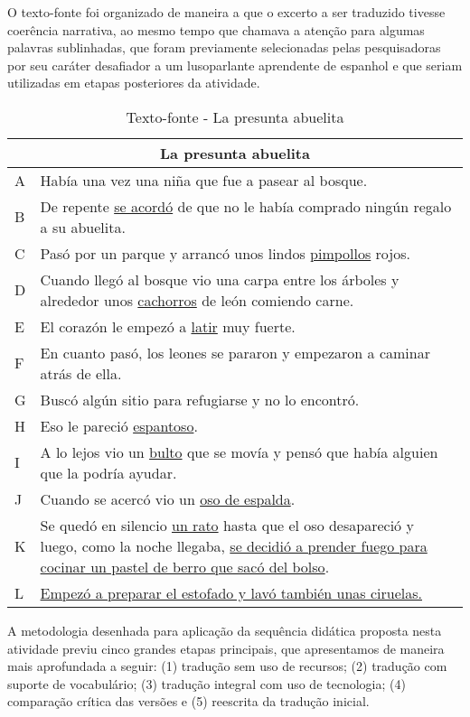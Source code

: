 \documentclass[portuguese]{textolivre}
\begin{document}
O texto-fonte foi organizado de maneira a que o excerto a ser traduzido tivesse coerência narrativa, ao mesmo tempo que chamava a atenção para algumas palavras sublinhadas, que foram previamente selecionadas pelas pesquisadoras por seu caráter desafiador a um lusoparlante aprendente de espanhol e que seriam utilizadas em etapas posteriores da atividade.

\begin{table}[h!]
\centering
\caption{Texto-fonte - La presunta abuelita}
\label{quadro1}
\begin{tabular}{l p{13.6cm}}
\toprule 
\multicolumn{2}{c}{La presunta abuelita} \\
\midrule
A & Había una vez una niña que fue a pasear al bosque.\\ 
B & De repente \underline{se acordó} de que no le había comprado ningún regalo a su abuelita. \\  
C & Pasó por un parque y arrancó unos lindos \underline{pimpollos} rojos. \\
D & Cuando llegó al bosque vio una carpa entre los árboles y alrededor unos \underline{cachorros} de león comiendo carne. \\
E & El corazón le empezó a \underline{latir} muy fuerte.\\
F & En cuanto pasó, los leones se pararon y empezaron a caminar atrás de ella.\\
G & Buscó algún sitio para refugiarse y no lo encontró. \\
H & Eso le pareció \underline{espantoso}. \\
I & A lo lejos vio un \underline{bulto} que se movía y pensó que había alguien que la podría ayudar. \\
J & Cuando se acercó vio un \underline{oso de espalda}. \\
K & Se quedó en silencio \underline{un rato} hasta que el oso desapareció y luego, como la noche llegaba, \underline{se decidió a prender fuego para cocinar un pastel de berro que sacó del bolso}. \\
L & \underline{Empezó a preparar el estofado y lavó también unas ciruelas.} \\
\bottomrule
\end{tabular}
\end{table}

A metodologia desenhada para aplicação da sequência didática proposta nesta atividade previu cinco grandes etapas principais, que apresentamos de maneira mais aprofundada a seguir: (1) tradução sem uso de recursos; (2) tradução com suporte de vocabulário; (3) tradução integral com uso de tecnologia; (4) comparação crítica das versões e (5) reescrita da tradução inicial.
\end{document}

